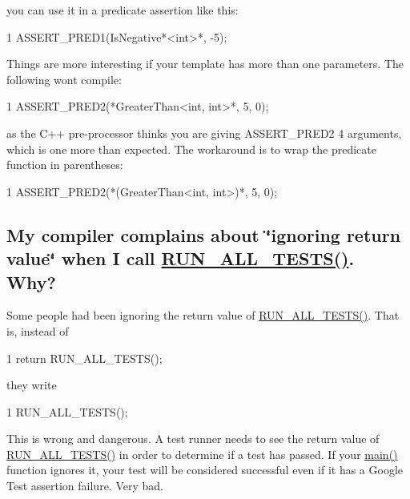 you can use it in a predicate assertion like this\+:


\begin{DoxyCode}
1 ASSERT\_PRED1(IsNegative*<int>*, -5);
\end{DoxyCode}


Things are more interesting if your template has more than one parameters. The following won\textquotesingle{}t compile\+:


\begin{DoxyCode}
1 ASSERT\_PRED2(*GreaterThan<int, int>*, 5, 0);
\end{DoxyCode}


as the C++ pre-\/processor thinks you are giving {\ttfamily A\+S\+S\+E\+R\+T\+\_\+\+P\+R\+E\+D2} 4 arguments, which is one more than expected. The workaround is to wrap the predicate function in parentheses\+:


\begin{DoxyCode}
1 ASSERT\_PRED2(*(GreaterThan<int, int>)*, 5, 0);
\end{DoxyCode}


\subsection*{My compiler complains about \char`\"{}ignoring return value\char`\"{} when I call \hyperlink{gtest_8h_a853a3792807489591d3d4a2f2ff9359f}{R\+U\+N\+\_\+\+A\+L\+L\+\_\+\+T\+E\+S\+T\+S()}. Why?}

Some people had been ignoring the return value of {\ttfamily \hyperlink{gtest_8h_a853a3792807489591d3d4a2f2ff9359f}{R\+U\+N\+\_\+\+A\+L\+L\+\_\+\+T\+E\+S\+T\+S()}}. That is, instead of


\begin{DoxyCode}
1 return RUN\_ALL\_TESTS();
\end{DoxyCode}


they write


\begin{DoxyCode}
1 RUN\_ALL\_TESTS();
\end{DoxyCode}


This is wrong and dangerous. A test runner needs to see the return value of {\ttfamily \hyperlink{gtest_8h_a853a3792807489591d3d4a2f2ff9359f}{R\+U\+N\+\_\+\+A\+L\+L\+\_\+\+T\+E\+S\+T\+S()}} in order to determine if a test has passed. If your {\ttfamily \hyperlink{app_2main_8cpp_ae66f6b31b5ad750f1fe042a706a4e3d4}{main()}} function ignores it, your test will be considered successful even if it has a Google Test assertion failure. Very bad.

